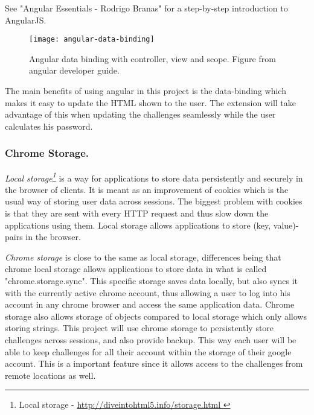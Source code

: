 See "Angular Essentials - Rodrigo Branas"\cite{angularjs-book} for a step-by-step introduction to AngularJS.

\begin{figure}[h]
    \texttt{[image: angular-data-binding]} 
    \caption{Angular data binding with controller, view and scope. Figure from angular developer guide.}
    \label{angular-data-binding}
\end{figure}


\par The main benefits of using angular in this project is the data-binding which makes it easy to update the HTML shown to the user. The extension will take advantage of this when updating the challenges seamlessly while the user calculates his password.

\subsubsection{Chrome Storage.}\label{chrome-storage}
\emph{Local storage\footnote{Local storage - \url{ http://diveintohtml5.info/storage.html }}} is a way for applications to store data persistently and securely in the browser of clients. It is meant as an improvement of cookies which is the usual way of storing user data across sessions. The biggest problem with cookies is that they are sent with every HTTP request and thus slow down the applications using them. Local storage allows applications to store (key, value)-pairs in the browser. 
\par \emph{Chrome storage} is close to the same as local storage, differences being that chrome local storage allows applications to store data in what is called "chrome.storage.sync". This specific storage saves data locally, but also syncs it with the currently active chrome account, thus allowing a user to log into his account in any chrome browser and access the same application data. Chrome storage also allows storage of objects compared to local storage which only allows storing strings. This project will use chrome storage to persistently store challenges across sessions, and also provide backup. This way each user will be able to keep challenges for all their account within the storage of their google account. This is a important feature since it allows access to the challenges from remote locations as well.


